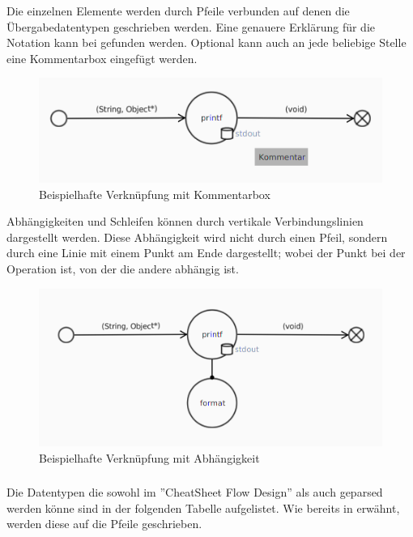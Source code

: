 Die einzelnen Elemente werden durch Pfeile verbunden auf denen die Übergabedatentypen geschrieben werden. Eine genauere
Erklärung für die Notation kann bei  gefunden werden. Optional kann auch an jede beliebige Stelle
eine Kommentarbox eingefügt werden.
\begin{figure}[H]
	\centering
	\includegraphics[width=\maxwidth{.9\textwidth}]{Element_connected_comment.png}
	\caption{Beispielhafte Verknüpfung mit Kommentarbox}
	\label{flowElementConnectedComment}
\end{figure}

Abhängigkeiten und Schleifen können durch vertikale Verbindungslinien dargestellt werden. Diese Abhängigkeit wird nicht durch einen
Pfeil, sondern durch eine Linie mit einem Punkt am Ende dargestellt; wobei der Punkt bei der Operation ist, von der die andere
abhängig ist.
\begin{figure}[H]
	\centering
	\includegraphics[width=\maxwidth{.9\textwidth}]{Element_connected_dep.png}
	\caption{Beispielhafte Verknüpfung mit Abhängigkeit}
	\label{flowElementConnectedDep}
\end{figure}

\subsubsection{\textFlowNotation}
\label{\textFlowNotation}
Die Datentypen die sowohl im ''CheatSheet Flow Design'' \cite{flowDesign} als auch geparsed werden könne sind in der folgenden
Tabelle aufgelistet. Wie bereits in  erwähnt, werden diese auf die Pfeile geschrieben.


